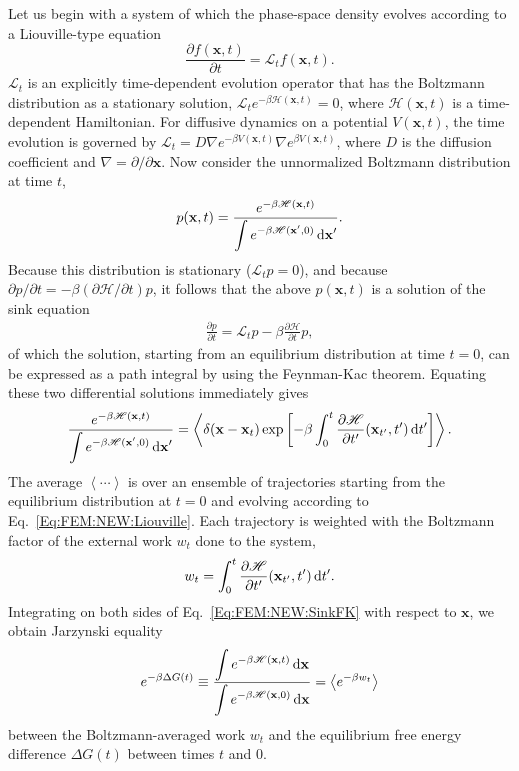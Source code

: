 Let us begin with a system of which the phase-space density evolves according to a Liouville-type equation
\begin{equation}
	\frac{\partial f(\mathbf{x},t)}{\partial t}=\mathscr{L}_tf(\mathbf{x},t).
	\label{Eq:FEM:NEW:Liouville}
\end{equation}
$\mathscr{L}_t$ is an explicitly time-dependent evolution operator that has the Boltzmann distribution as a stationary solution, $\mathscr{L}_t e^{-\beta \mathscr{H}(\mathbf{x},t)}=0$, where $\mathscr{H}(\mathbf{x},t)$ is a time-dependent Hamiltonian. For diffusive dynamics on a potential $V(\mathbf{x},t)$, the time evolution is governed by $\mathscr{L}_t=D\nabla e^{-\beta V(\mathbf{x},t)}\nabla e^{\beta V(\mathbf{x},t)}$, where $D$ is the diffusion coefficient and $\nabla=\partial/\partial \mathbf{x}$. Now consider the unnormalized Boltzmann distribution at time $t$,
\begin{align}
	p(\mathbf{x},t)=\frac{e^{-\beta \mathscr{H}(\mathbf{x},t)}}{\displaystyle\int e^{-\beta \mathscr{H}(\mathbf{x}^\prime,0)} \mathop{}\!\mathrm{d}\mathbf{x}^\prime}.
\end{align}
Because this distribution is stationary ($\mathscr{L}_tp=0$), and because $\partial p/\partial t=-\beta(\partial \mathscr{H}/\partial t)p$, it follows that the above $p(\mathbf{x},t)$ is a solution of the sink equation
\begin{align}
	\frac{\partial p}{\partial t}=\mathscr{L}_tp-\beta\frac{\partial \mathscr{H}}{\partial t}p,
\end{align}
of which the solution, starting from an equilibrium distribution at time $t=0$, can be expressed as a path integral by using the Feynman-Kac theorem. Equating these two differential solutions immediately gives
\begin{equation}
	\frac{e^{-\beta\mathscr{H}(\mathbf{x},t)}}{\displaystyle\int e^{-\beta \mathscr{H}(\mathbf{x}^\prime,0)} \mathop{}\!\mathrm{d} \mathbf{x}^\prime}=\left\langle \delta(\mathbf{x}-\mathbf{x}_t)\exp{\left[-\beta\int_0^t\frac{\partial \mathscr{H}}{\partial t^\prime}(\mathbf{x}_{t^{\prime}},t^{\prime})\mathop{}\!\mathrm{d}t^\prime\right]}\right\rangle.
	\label{Eq:FEM:NEW:SinkFK}
\end{equation}
The average $\left\langle \cdots \right\rangle$ is over an ensemble of trajectories starting from the equilibrium distribution at $t=0$ and evolving according to Eq.~\ref{Eq:FEM:NEW:Liouville}. Each trajectory is weighted with the Boltzmann factor of the external work $w_t$ done to the system,
\begin{equation}
	w_t=\int_0^t\frac{\partial \mathscr{H}}{\partial t^\prime}(\mathbf{x}_{t^{\prime}},t^{\prime})\mathop{}\!\mathrm{d} t^\prime.
\end{equation}
Integrating on both sides of Eq.~\ref{Eq:FEM:NEW:SinkFK} with respect to $\mathbf{x}$, we obtain Jarzynski equality
\begin{equation}
	e^{-\beta \Delta G(t)}\equiv \frac{\displaystyle\int e^{-\beta\mathscr{H}(\mathbf{x},t)}\mathop{}\!\mathrm{d} \mathbf{x}}{\displaystyle\int e^{-\beta \mathscr{H}(\mathbf{x},0)} \mathop{}\!\mathrm{d} \mathbf{x}}=\left \langle e^{-\beta w_t}\right\rangle
\end{equation}
between the Boltzmann-averaged work $w_t$ and the equilibrium free energy difference $\Delta G(t)$ between times $t$ and $0$.

